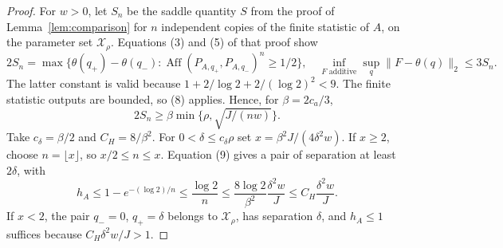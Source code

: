 \documentclass[11pt]{article}
\newcommand{\Aff}{\operatorname{Aff}}
\begin{document}
\begin{proof}
For $w>0$, let $S_n$ be the saddle quantity $S$ from the proof of
Lemma~\ref{lem:comparison} for $n$ independent copies of the finite
statistic of $A$, on the parameter set $\mathcal X_\rho$.
Equations (3) and (5) of that proof show
\[
 2S_n=\max\{\theta(q_+)-\theta(q_-):
             \Aff(P_{A,q_+},P_{A,q_-})^n\ge1/2\},
 \quad \inf_{F\text{ additive}}\sup_q\|F-\theta(q)\|_2\le3S_n.
\]
The latter constant is valid because
$1+2/\log2+2/(\log2)^2<9$. The finite statistic outputs are bounded, so
(8) applies. Hence, for $\beta=2c_a/3$,
\[
 2S_n\ge\beta\min\{\rho,\sqrt{J/(nw)}\}.                 \tag{9}
\]
Take $c_\delta=\beta/2$ and $C_H=8/\beta^2$.
For $0<\delta\le c_\delta\rho$ set
$x=\beta^2J/(4\delta^2w)$. If $x\ge2$, choose $n=\lfloor x\rfloor$,
so $x/2\le n\le x$. Equation (9) gives a pair of separation at least
$2\delta$, with
\[
 h_A\le1-e^{-(\log2)/n}
       \le\frac{\log2}{n}
       \le\frac{8\log2}{\beta^2}\frac{\delta^2w}{J}
       \le C_H\frac{\delta^2w}{J}.
\]
If $x<2$, the pair $q_-=0$, $q_+=\delta$ belongs to
$\mathcal X_\rho$, has separation $\delta$, and $h_A\le1$ suffices
because $C_H\delta^2w/J>1$.
\end{proof}
\end{document}
